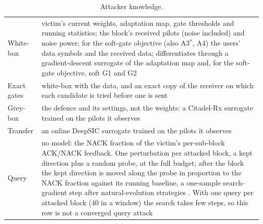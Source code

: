 \documentclass[journal]{IEEEtran}
\theoremstyle{remark}
\begin{document}
\begin{table}[t]
\centering\caption{Attacker knowledge.}\label{tab:knowledge}
\scriptsize
\begin{tabular}{@{}L{18mm}L{67mm}@{}}
\toprule
White-box & victim's current weights, adaptation map, gate thresholds and running statistics; the block's received pilots (noise included) and noise power; for the soft-gate objective (also A3$^\ast$, A4) the users' data symbols and the received data; differentiates through a gradient-descent surrogate of the adaptation map and, for the soft-gate objective, soft G1 and G2\\
Exact gates & white-box with the data, and an exact copy of the receiver on which each candidate is tried before one is sent\\
Grey-box & the defence and its settings, not the weights: a Citadel-Rx surrogate trained on the pilots it observes\\
Transfer & an online DeepSIC surrogate trained on the pilots it observes\\
Query & no model: the NACK fraction of the victim's per-sub-block ACK/NACK feedback. One perturbation per attacked block, a kept direction plus a random probe, at the full budget; after the block the kept direction is moved along the probe in proportion to the NACK fraction against its running baseline, a one-sample search-gradient step after natural-evolution strategies \cite{wierstra2014,ilyas2018}. With one query per attacked block (40 in a window) the search takes few steps, so this row is not a converged query attack\\
\bottomrule
\end{tabular}
\end{table}
\end{document}
